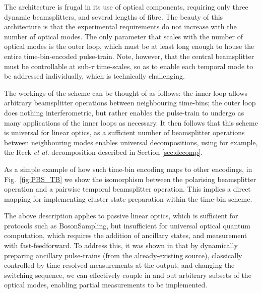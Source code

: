 \documentclass[times,final]{elsarticle}
\begin{document}
The architecture is frugal in its use of optical components, requiring only three dynamic beamsplitters, and several lengths of fibre. The beauty of this architecture is that the experimental requirements do not increase with the number of optical modes. The only parameter that scales with the number of optical modes is the outer loop, which must be at least long enough to house the entire time-bin-encoded pulse-train. Note, however, that the central beamsplitter must be controllable at sub-$\tau$ time-scales, so as to enable each temporal mode to be addressed individually, which is technically challenging.

The workings of the scheme can be thought of as follows: the inner loop allows arbitrary beamsplitter operations between neighbouring time-bins; the outer loop does nothing interferometric, but rather enables the pulse-train to undergo as many applications of the inner loops as necessary. It then follows that this scheme is universal for linear optics, as a sufficient number of beamsplitter operations between neighbouring modes enables universal decompositions, using for example, the Reck \emph{et al.} decomposition described in Section \ref{sec:decomp}.

As a simple example of how such time-bin encoding maps to other encodings, in Fig.~\ref{fig:PBS_TB} we show the isomorphism between the polarising beamsplitter operation and a pairwise temporal beamsplitter operation. This implies a direct mapping for implementing cluster state preparation within the time-bin scheme.


The above description applies to passive linear optics, which is sufficient for protocols such as {\sc BosonSampling}, but insufficient for universal optical quantum computation, which requires the addition of ancillary states, and measurement with fast-feedforward. To address this, it was shown in \cite{Rohde15} that by dynamically preparing ancillary pulse-trains (from the already-existing source), classically controlled by time-resolved measurements at the output, and changing the switching sequence, we can effectively couple in and out arbitrary subsets of the optical modes, enabling partial measurements to be implemented.
\end{document}
